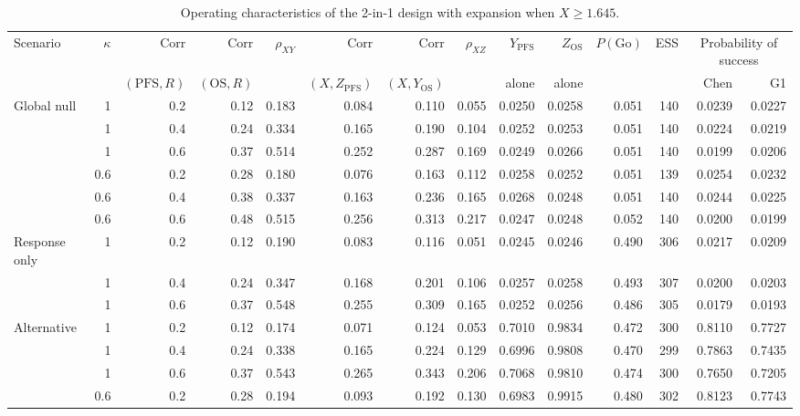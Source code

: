 \begin{table}[htbp]
\centering
\caption{Operating characteristics of the 2-in-1 design with expansion when $X \ge 1.645$.}
\label{tab:twoinone}
\begin{threeparttable}
\footnotesize
\begin{tabular}{lrrrrrrrrrrrrr}
\toprule
Scenario & $\kappa$ & $\mathrm{Corr}$ & $\mathrm{Corr}$ & $\rho_{XY}$ & $\mathrm{Corr}$ & $\mathrm{Corr}$ & $\rho_{XZ}$ & $Y_{\mathrm{PFS}}$ & $Z_{\mathrm{OS}}$ & $P(\mathrm{Go})$ & ESS & \multicolumn{2}{c}{Probability of success} \\
\cmidrule(lr){13-14}
 & & $(\mathrm{PFS}, R)$ & $(\mathrm{OS}, R)$ & & $(X, Z_{\mathrm{PFS}})$ & $(X, Y_{\mathrm{OS}})$ & & alone & alone & & & Chen & G1 \\
\midrule
Global null & 1 & 0.2 & 0.12 & 0.183 & 0.084 & 0.110 & 0.055 & 0.0250 & 0.0258 & 0.051 & 140 & 0.0239 & 0.0227 \\
 & 1 & 0.4 & 0.24 & 0.334 & 0.165 & 0.190 & 0.104 & 0.0252 & 0.0253 & 0.051 & 140 & 0.0224 & 0.0219 \\
 & 1 & 0.6 & 0.37 & 0.514 & 0.252 & 0.287 & 0.169 & 0.0249 & 0.0266 & 0.051 & 140 & 0.0199 & 0.0206 \\
 & 0.6 & 0.2 & 0.28 & 0.180 & 0.076 & 0.163 & 0.112 & 0.0258 & 0.0252 & 0.051 & 139 & 0.0254 & 0.0232 \\
 & 0.6 & 0.4 & 0.38 & 0.337 & 0.163 & 0.236 & 0.165 & 0.0268 & 0.0248 & 0.051 & 140 & 0.0244 & 0.0225 \\
 & 0.6 & 0.6 & 0.48 & 0.515 & 0.256 & 0.313 & 0.217 & 0.0247 & 0.0248 & 0.052 & 140 & 0.0200 & 0.0199 \\
\midrule
Response only & 1 & 0.2 & 0.12 & 0.190 & 0.083 & 0.116 & 0.051 & 0.0245 & 0.0246 & 0.490 & 306 & 0.0217 & 0.0209 \\
 & 1 & 0.4 & 0.24 & 0.347 & 0.168 & 0.201 & 0.106 & 0.0257 & 0.0258 & 0.493 & 307 & 0.0200 & 0.0203 \\
 & 1 & 0.6 & 0.37 & 0.548 & 0.255 & 0.309 & 0.165 & 0.0252 & 0.0256 & 0.486 & 305 & 0.0179 & 0.0193 \\
\midrule
Alternative & 1 & 0.2 & 0.12 & 0.174 & 0.071 & 0.124 & 0.053 & 0.7010 & 0.9834 & 0.472 & 300 & 0.8110 & 0.7727 \\
 & 1 & 0.4 & 0.24 & 0.338 & 0.165 & 0.224 & 0.129 & 0.6996 & 0.9808 & 0.470 & 299 & 0.7863 & 0.7435 \\
 & 1 & 0.6 & 0.37 & 0.543 & 0.265 & 0.343 & 0.206 & 0.7068 & 0.9810 & 0.474 & 300 & 0.7650 & 0.7205 \\
 & 0.6 & 0.2 & 0.28 & 0.194 & 0.093 & 0.192 & 0.130 & 0.6983 & 0.9915 & 0.480 & 302 & 0.8123 & 0.7743 \\

\end{tabular}
\end{threeparttable}
\end{table}
